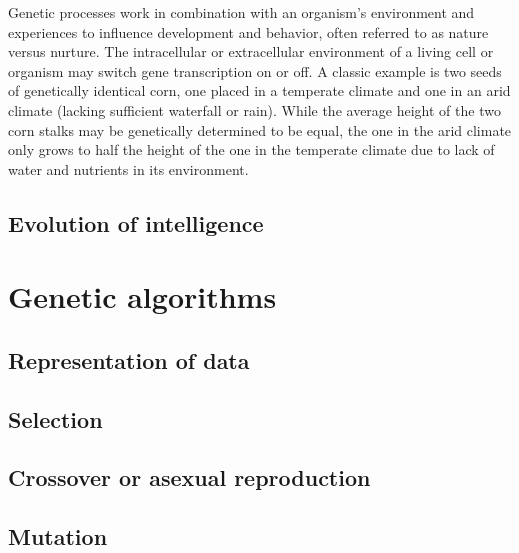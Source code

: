 Genetic processes work in combination with an organism's environment and experiences to influence
development and behavior, often referred to as nature versus nurture.
The intracellular or extracellular environment of a living cell or organism may switch gene 
transcription on or off. 
A classic example is two seeds of genetically identical corn, one placed in a temperate
climate and one in an arid climate (lacking sufficient waterfall or rain).
While the average height of the two corn stalks may be genetically determined to be equal, 
the one in the arid climate only grows to half the height of the one in the temperate climate
due to lack of water and nutrients in its environment. 


\subsection{Evolution of intelligence}

\section{Genetic algorithms}

\subsection{Representation of data}

\subsection{Selection}

\subsection{Crossover or asexual reproduction}

\subsection{Mutation}

